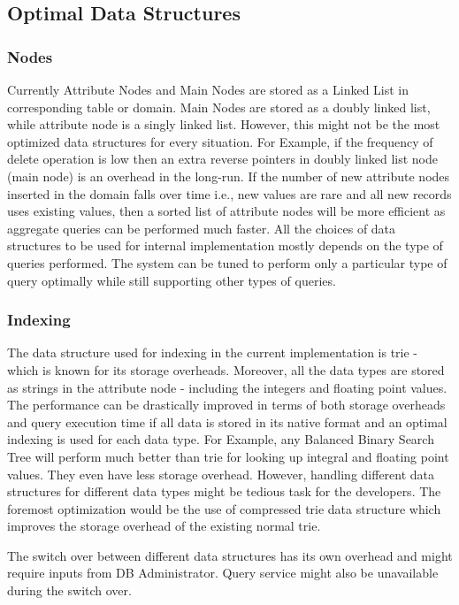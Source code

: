 \documentclass[12pt, oneside]{book}
\begin{document}
\subsection{Optimal Data Structures}
\subsubsection{Nodes}
Currently Attribute Nodes and Main Nodes are stored as a Linked List in corresponding table or domain. Main Nodes are stored as a doubly linked list, while attribute node is a singly linked list. However, this might not be the most optimized data structures for every situation. For Example, if the frequency of delete operation is low then an extra reverse pointers in doubly linked list node (main node) is an overhead in the long-run. If the number of new attribute nodes inserted in the domain falls over time i.e., new values are rare and all new records uses existing values, then a sorted list of attribute nodes will be more efficient as aggregate queries can be performed much faster. All the choices of data structures to be used for internal implementation mostly depends on the type of queries performed. The system can be tuned to perform only a particular type of query optimally while still supporting other types of queries.
\subsubsection{Indexing}
The data structure used for indexing in the current implementation is trie - which is known for its storage overheads. Moreover, all the data types are stored as strings in the attribute node - including the integers and floating point values. The performance can be drastically improved in terms of both storage overheads and query execution time if all data is stored in its native format and an optimal indexing is used for each data type. For Example, any Balanced Binary Search Tree will perform much better than trie for looking up integral and floating point values. They even have less storage overhead. However, handling different data structures for different data types might be tedious task for the developers. The foremost optimization would be the use of compressed trie data structure which improves the storage overhead of the existing normal trie. \\ \par
The switch over between different data structures has its own overhead and might require inputs from DB Administrator. Query service might also be unavailable during the switch over.
\end{document}
